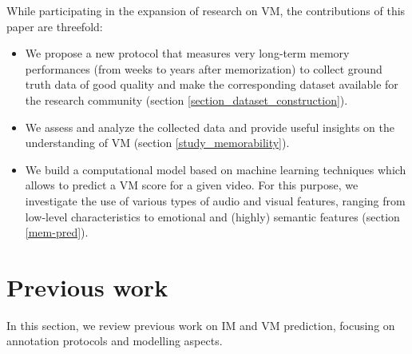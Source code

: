 \documentclass[sigconf]{acmart}
\begin{document}
While participating in the expansion of research on VM, the contributions of this paper are threefold:
\begin{itemize}
	\item We propose a new protocol that measures very long-term memory performances (from weeks to years after memorization) to collect ground truth data of good quality and make the corresponding dataset available for the research community (section \ref{section_dataset_construction}).
	\item We assess and analyze the collected data and provide useful insights on the understanding of VM (section \ref{study_memorability}).
	\item We build a computational model based on machine learning techniques which allows to predict a VM score for a given video. For this purpose, we investigate the use of various types of audio and visual features, ranging from low-level characteristics to emotional and (highly) semantic features (section \ref{mem-pred}).
\end{itemize}

\section{Previous work}
In this section, we review previous work on IM and VM prediction, focusing on annotation protocols and modelling aspects.
\end{document}

